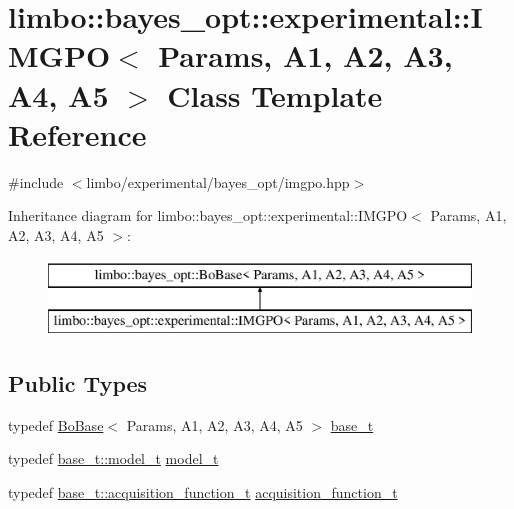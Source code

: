 \hypertarget{classlimbo_1_1bayes__opt_1_1experimental_1_1_i_m_g_p_o}{}\section{limbo\+:\+:bayes\+\_\+opt\+:\+:experimental\+:\+:I\+M\+G\+P\+O$<$ Params, A1, A2, A3, A4, A5 $>$ Class Template Reference}
\label{classlimbo_1_1bayes__opt_1_1experimental_1_1_i_m_g_p_o}


{\ttfamily \#include $<$limbo/experimental/bayes\+\_\+opt/imgpo.\+hpp$>$}

Inheritance diagram for limbo\+:\+:bayes\+\_\+opt\+:\+:experimental\+:\+:I\+M\+G\+P\+O$<$ Params, A1, A2, A3, A4, A5 $>$\+:\begin{figure}[H]
\begin{center}
\leavevmode
\includegraphics[height=2.000000cm]{classlimbo_1_1bayes__opt_1_1experimental_1_1_i_m_g_p_o}
\end{center}
\end{figure}
\subsection*{Public Types}
\begin{DoxyCompactItemize}
\item 
typedef \hyperlink{classlimbo_1_1bayes__opt_1_1_bo_base}{Bo\+Base}$<$ Params, A1, A2, A3, A4, A5 $>$ \hyperlink{classlimbo_1_1bayes__opt_1_1experimental_1_1_i_m_g_p_o_a08e12049587eed6be7bc86f05da043f0}{base\+\_\+t}
\item 
typedef \hyperlink{classlimbo_1_1bayes__opt_1_1_bo_base_a1ddc93cc023a2d7d527deb4cc750624e}{base\+\_\+t\+::model\+\_\+t} \hyperlink{classlimbo_1_1bayes__opt_1_1experimental_1_1_i_m_g_p_o_a2a2958dccaec1f7f1b21a2d4c85cf1fc}{model\+\_\+t}
\item 
typedef \hyperlink{classlimbo_1_1bayes__opt_1_1_bo_base_a02b14991b62e0f8c9bcf834220ed62e4}{base\+\_\+t\+::acquisition\+\_\+function\+\_\+t} \hyperlink{classlimbo_1_1bayes__opt_1_1experimental_1_1_i_m_g_p_o_af7f26bfe0e3119ce147088e9e8fbfc17}{acquisition\+\_\+function\+\_\+t}
\end{DoxyCompactItemize}
